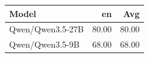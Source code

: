 \begin{tabular}{lrr}
\hline
Model & en & Avg \\
\hline
Qwen/Qwen3.5-27B & 80.00 & 80.00 \\
Qwen/Qwen3.5-9B & 68.00 & 68.00 \\
\hline
\end{tabular}
